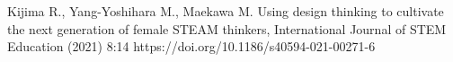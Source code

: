 \documentclass[
12pt,		%
openright,	%
twoside,  %
a4paper,			%
chapter=TITLE,		%
english,			%
french,				%
spanish,			%
brazil				%
]{USPSC-classe/USPSC_RedarTex}
\begin{document}
\begin{flushleft}
\begin{flushleft}
\begin{flushleft}
\begin{flushleft}
\begin{flushleft}
\begin{flushleft}
\begin{flushleft}
\begin{flushleft}
\begin{flushleft}
\begin{flushleft}
[Kijima et al., 2021] Kijima R., Yang-Yoshihara M., Maekawa M. Using design thinking to cultivate the next generation of female STEAM thinkers, International Journal of STEM Education (2021) 8:14 https://doi.org/10.1186/s40594-021-00271-6
\end{flushleft}


\end{flushleft}


\end{flushleft}


\end{flushleft}


\end{flushleft}


\end{flushleft}


\end{flushleft}


\end{flushleft}


\end{flushleft}


\end{flushleft}
\end{document}

